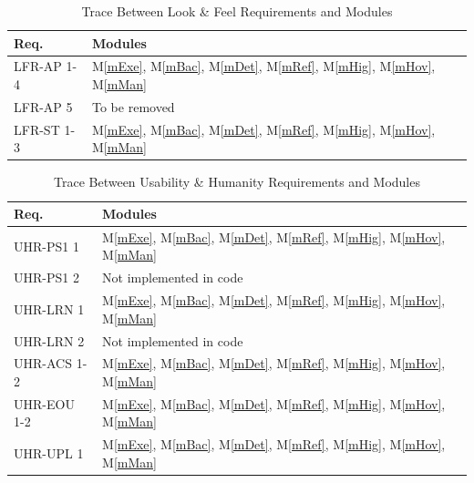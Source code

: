 \documentclass[12pt, titlepage]{article}
\newcommand{\mref}[1]{M\ref{#1}}
\begin{document}
\begin{table}[H]
  \centering
  \begin{tabular}{p{} p{}}
    \toprule \textbf{Req.} & \textbf{Modules}\\
    \midrule
    LFR-AP 1-4 & \mref{mExe}, \mref{mBac}, \mref{mDet}, \mref{mRef}, \mref{mHig}, \mref{mHov}, \mref{mMan}\\ 
    LFR-AP 5 & To be removed\\ 
    LFR-ST 1-3 & \mref{mExe}, \mref{mBac}, \mref{mDet}, \mref{mRef}, \mref{mHig}, \mref{mHov}, \mref{mMan}\\
    \bottomrule
  \end{tabular}
  \caption{Trace Between Look \& Feel Requirements and Modules}
  \label{tab:LFR-mod}
\end{table}

\begin{table}[H]
  \centering
  \begin{tabular}{p{} p{}}
    \toprule \textbf{Req.} & \textbf{Modules}\\
    \midrule
    UHR-PS1 1 & \mref{mExe}, \mref{mBac}, \mref{mDet}, \mref{mRef}, \mref{mHig}, \mref{mHov}, \mref{mMan}\\ 
    UHR-PS1 2 & Not implemented in code\\ 
    UHR-LRN 1 & \mref{mExe}, \mref{mBac}, \mref{mDet}, \mref{mRef}, \mref{mHig}, \mref{mHov}, \mref{mMan}\\ 
    UHR-LRN 2 & Not implemented in code\\ 
    UHR-ACS 1-2 & \mref{mExe}, \mref{mBac}, \mref{mDet}, \mref{mRef}, \mref{mHig}, \mref{mHov}, \mref{mMan}\\ 
    UHR-EOU 1-2 & \mref{mExe}, \mref{mBac}, \mref{mDet}, \mref{mRef}, \mref{mHig}, \mref{mHov}, \mref{mMan}\\ 
    UHR-UPL 1 & \mref{mExe}, \mref{mBac}, \mref{mDet}, \mref{mRef}, \mref{mHig}, \mref{mHov}, \mref{mMan}\\ 
    \bottomrule
  \end{tabular}
  \caption{Trace Between Usability \& Humanity Requirements and Modules}
  \label{tab:UHR-mod}
\end{table}
\end{document}
